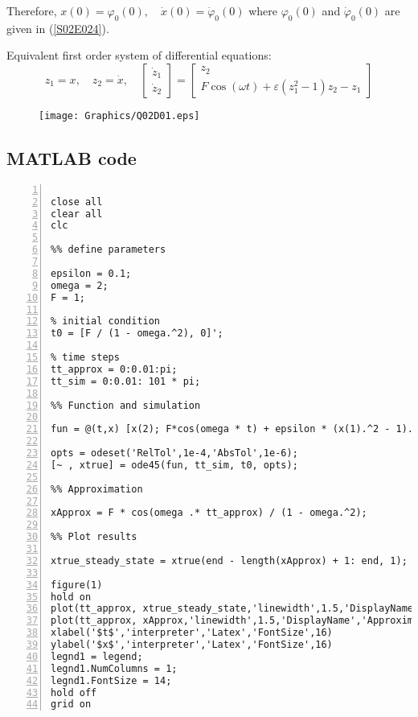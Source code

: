 \documentclass[twoside,10pt,a4paper]{article}
\begin{document}
\begin{enumerate}[label=(\roman*)]
Therefore, $x(0)=\varphi_0(0), \quad \dot{x}(0) = \dot{\varphi}_0(0)$ where $\varphi_0(0)$ and $\dot{\varphi}_0(0)$ are given in (\ref{S02E024}).

Equivalent first order system of differential equations:
\begin{equation}
	z_1 = x, \quad z_2 = \dot{x}, \quad \begin{bmatrix}
		\dot{z}_1 \\
		\dot{z}_2
	\end{bmatrix} = \begin{bmatrix}
		z_2 \\
		F\cos(\omega t) + \varepsilon(z_1^2 - 1)z_2 - z_1
	\end{bmatrix}
\end{equation}
\begin{figure}[H]
	\centering
	\texttt{[image: Graphics/Q02D01.eps]}
\end{figure}
\end{enumerate}

\subsection*{MATLAB code}
\begin{Verbatim}[numbers = left]
%% Initiate Script

close all
clear all
clc

%% define parameters

epsilon = 0.1;
omega = 2;
F = 1;

% initial condition
t0 = [F / (1 - omega.^2), 0]';

% time steps
tt_approx = 0:0.01:pi;
tt_sim = 0:0.01: 101 * pi;

%% Function and simulation

fun = @(t,x) [x(2); F*cos(omega * t) + epsilon * (x(1).^2 - 1).*x(2) - x(1)];

opts = odeset('RelTol',1e-4,'AbsTol',1e-6);
[~ , xtrue] = ode45(fun, tt_sim, t0, opts);

%% Approximation

xApprox = F * cos(omega .* tt_approx) / (1 - omega.^2);

%% Plot results

xtrue_steady_state = xtrue(end - length(xApprox) + 1: end, 1); % only take the last 315 values

figure(1)
hold on
plot(tt_approx, xtrue_steady_state,'linewidth',1.5,'DisplayName','ODE45');
plot(tt_approx, xApprox,'linewidth',1.5,'DisplayName','Approximation');
xlabel('$t$','interpreter','Latex','FontSize',16)
ylabel('$x$','interpreter','Latex','FontSize',16)
legnd1 = legend;
legnd1.NumColumns = 1;
legnd1.FontSize = 14;
hold off
grid on
\end{Verbatim}
\end{document}
